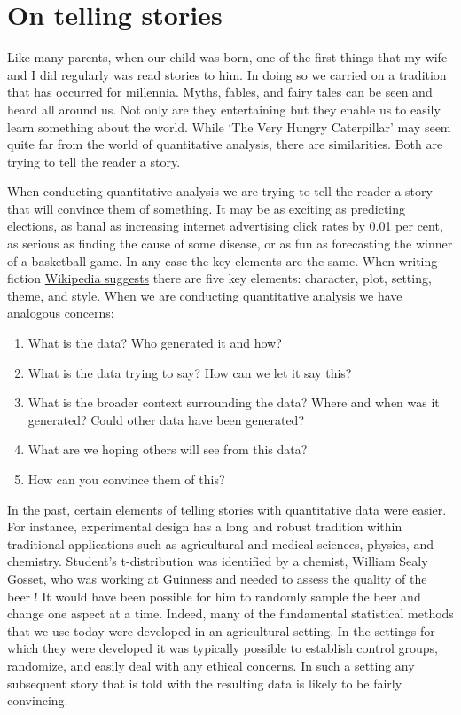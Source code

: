 \documentclass[
]{book}
\providecommand{\tightlist}{%
  \setlength{\itemsep}{0pt}\setlength{\parskip}{0pt}}
\begin{document}
\hypertarget{on-telling-stories}{%
\section{On telling stories}\label{on-telling-stories}}

Like many parents, when our child was born, one of the first things that my wife and I did regularly was read stories to him. In doing so we carried on a tradition that has occurred for millennia. Myths, fables, and fairy tales can be seen and heard all around us. Not only are they entertaining but they enable us to easily learn something about the world. While `The Very Hungry Caterpillar' may seem quite far from the world of quantitative analysis, there are similarities. Both are trying to tell the reader a story.

When conducting quantitative analysis we are trying to tell the reader a story that will convince them of something. It may be as exciting as predicting elections, as banal as increasing internet advertising click rates by 0.01 per cent, as serious as finding the cause of some disease, or as fun as forecasting the winner of a basketball game. In any case the key elements are the same. When writing fiction \href{https://en.wikipedia.org/wiki/Fiction_writing}{Wikipedia suggests} there are five key elements: character, plot, setting, theme, and style. When we are conducting quantitative analysis we have analogous concerns:

\begin{enumerate}
\def\labelenumi{\arabic{enumi}.}
\tightlist
\item
  What is the data? Who generated it and how?
\item
  What is the data trying to say? How can we let it say this?
\item
  What is the broader context surrounding the data? Where and when was it generated? Could other data have been generated?
\item
  What are we hoping others will see from this data?
\item
  How can you convince them of this?
\end{enumerate}

In the past, certain elements of telling stories with quantitative data were easier. For instance, experimental design has a long and robust tradition within traditional applications such as agricultural and medical sciences, physics, and chemistry. Student's t-distribution was identified by a chemist, William Sealy Gosset, who was working at Guinness and needed to assess the quality of the beer \citep{raju2005}! It would have been possible for him to randomly sample the beer and change one aspect at a time. Indeed, many of the fundamental statistical methods that we use today were developed in an agricultural setting. In the settings for which they were developed it was typically possible to establish control groups, randomize, and easily deal with any ethical concerns. In such a setting any subsequent story that is told with the resulting data is likely to be fairly convincing.
\end{document}
